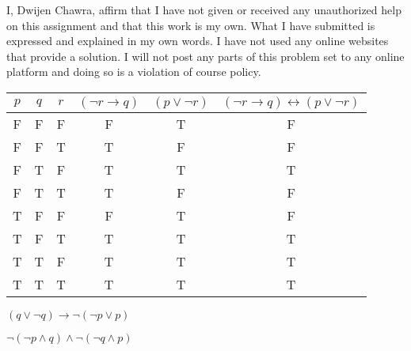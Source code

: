 \documentclass[11pt,largemargins]{homework}
\begin{document}
\maketitle

\newpage
\question

  I, Dwijen Chawra, affirm that I have not given or received any
  unauthorized help on this assignment and that this work is my own. What I have
  submitted is expressed and explained in my own words. I have not used any online
  websites that provide a solution. I will not post any parts of this problem set to any
  online platform and doing so is a violation of course policy.
  
\newpage
\question
\begin{tabular}{|c|c|c|c|c|c|}
  \hline
  $p$ & $q$ & $r$ & $(\neg r \rightarrow q)$  & $(p \vee \neg r)$ & $(\neg r \rightarrow q) \leftrightarrow (p \vee \neg r)$ \\ \hline
  F & F & F & F & T & F \\ \hline
  F & F & T & T & F & F \\ \hline
  F & T & F & T & T & T \\ \hline
  F & T & T & T & F & F \\ \hline
  T & F & F & F & T & F \\ \hline
  T & F & T & T & T & T \\ \hline
  T & T & F & T & T & T \\ \hline
  T & T & T & T & T & T \\ \hline

\end{tabular}

\newpage
\question

  $(q \vee \neg q) \rightarrow \neg (\neg p \vee p)$


\newpage
\question 
  $\neg (\neg p \land q) \land \neg (\neg q \land p)$
\end{document}
